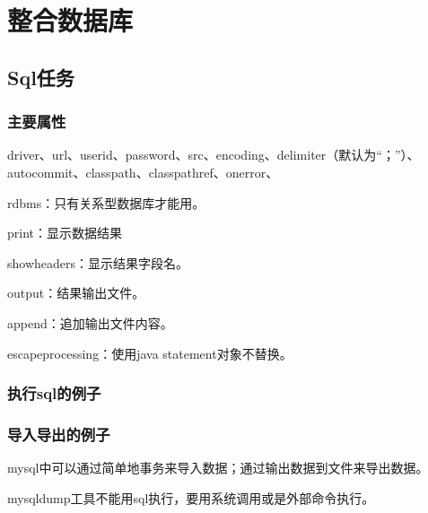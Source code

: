 \chapter{整合数据库}

\section{Sql任务}

\subsection{主要属性}

driver、url、userid、password、src、encoding、delimiter（默认为“；”）、autocommit、classpath、classpathref、onerror、

rdbms：只有关系型数据库才能用。

print：显示数据结果

showheaders：显示结果字段名。

output：结果输出文件。

append：追加输出文件内容。

escapeprocessing：使用java statement对象不替换。

\subsection{执行sql的例子}



\subsection{导入导出的例子}

mysql中可以通过简单地事务来导入数据；通过输出数据到文件来导出数据。



mysqldump工具不能用sql执行，要用系统调用或是外部命令执行。









